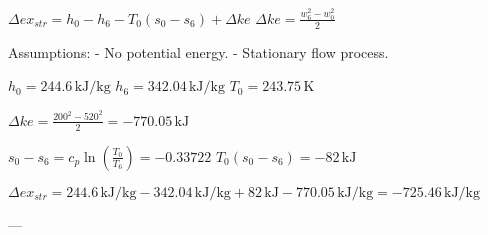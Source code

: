 \( \Delta ex_{str} = h_0 - h_6 - T_0 (s_0 - s_6) + \Delta ke \)  
\( \Delta ke = \frac{w_6^2 - w_0^2}{2} \)  

Assumptions:  
- No potential energy.  
- Stationary flow process.  

\( h_0 = 244.6 \, \text{kJ/kg} \)  
\( h_6 = 342.04 \, \text{kJ/kg} \)  
\( T_0 = 243.75 \, \text{K} \)  

\( \Delta ke = \frac{200^2 - 520^2}{2} = -770.05 \, \text{kJ} \)  

\( s_0 - s_6 = c_p \ln \left( \frac{T_0}{T_6} \right) = -0.33722 \)  
\( T_0 (s_0 - s_6) = -82 \, \text{kJ} \)  

\( \Delta ex_{str} = 244.6 \, \text{kJ/kg} - 342.04 \, \text{kJ/kg} + 82 \, \text{kJ} - 770.05 \, \text{kJ/kg} = -725.46 \, \text{kJ/kg} \)  

---